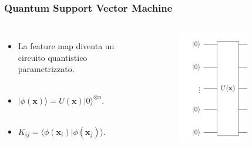 \documentclass{beamer}
\begin{document}
\begin{frame}
\begin{columns}
      
      \end{columns}
  
  \end{frame}




\begin{frame}
  \frametitle{Quantum Support Vector Machine}
  \begin{columns}
  
    \begin{itemize}
      \item La feature map diventa un circuito quantistico parametrizzato. \\\,
          \item $|\phi(\mathbf{x})\rangle=U(\mathbf{x})|0\rangle^{\otimes n}$.\\\,
          \item$K_{ij}=\langle \phi(\mathbf{x}_i)| \phi(\mathbf{x}_j) \rangle.$\\\,\\\,
          \end{itemize}
    
    \begin{figure}
          \includegraphics[width=0.7\textwidth]{images/Pasted image.png}
     \end{figure}


    
    \end{columns}

\end{frame}
\end{document}
